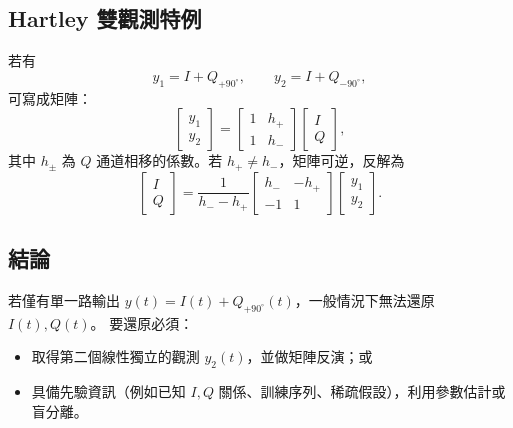 \documentclass{article}
\begin{document}
\subsection*{Hartley 雙觀測特例}
若有
\[
y_1=I+Q_{+90^{\circ}}, \qquad
y_2=I+Q_{-90^{\circ}},
\]
可寫成矩陣：
\[
\begin{bmatrix}y_1\\y_2\end{bmatrix}
=
\begin{bmatrix}
1 & h_{+}\\[4pt]
1 & h_{-}
\end{bmatrix}
\begin{bmatrix}I\\Q\end{bmatrix},
\]
其中 $h_{\pm}$ 為 $Q$ 通道相移的係數。若 $h_{+}\neq h_{-}$，矩陣可逆，反解為
\[
\begin{bmatrix}I\\Q\end{bmatrix}
=\frac{1}{h_{-}-h_{+}}
\begin{bmatrix}
h_{-} & -h_{+}\\[4pt]
-1 & 1
\end{bmatrix}
\begin{bmatrix}y_1\\y_2\end{bmatrix}.
\]

\subsection*{結論}
若僅有單一路輸出 $y(t)=I(t)+Q_{+\!90^{\circ}}(t)$，一般情況下無法還原 $I(t),Q(t)$。  
要還原必須：
\begin{itemize}
\item 取得第二個線性獨立的觀測 $y_2(t)$，並做矩陣反演；或
\item 具備先驗資訊（例如已知 $I,Q$ 關係、訓練序列、稀疏假設），利用參數估計或盲分離。
\end{itemize}
\end{document}
